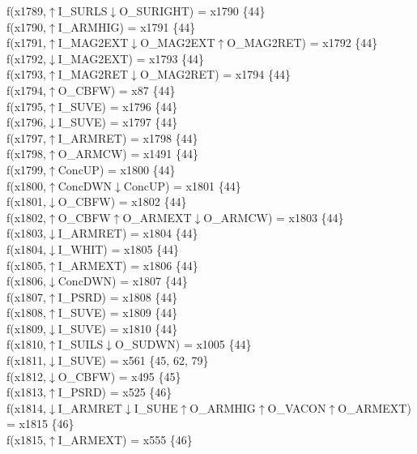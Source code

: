 f(x1789,$\uparrow$I\_SURLS$\downarrow$O\_SURIGHT) = x1790 \{44\} \\  
f(x1790,$\uparrow$I\_ARMHIG) = x1791 \{44\} \\  
f(x1791,$\uparrow$I\_MAG2EXT$\downarrow$O\_MAG2EXT$\uparrow$O\_MAG2RET) = x1792 \{44\} \\  
f(x1792,$\downarrow$I\_MAG2EXT) = x1793 \{44\} \\  
f(x1793,$\uparrow$I\_MAG2RET$\downarrow$O\_MAG2RET) = x1794 \{44\} \\  
f(x1794,$\uparrow$O\_CBFW) = x87 \{44\} \\  
f(x1795,$\uparrow$I\_SUVE) = x1796 \{44\} \\  
f(x1796,$\downarrow$I\_SUVE) = x1797 \{44\} \\  
f(x1797,$\uparrow$I\_ARMRET) = x1798 \{44\} \\  
f(x1798,$\uparrow$O\_ARMCW) = x1491 \{44\} \\  
f(x1799,$\uparrow$ConcUP) = x1800 \{44\} \\  
f(x1800,$\uparrow$ConcDWN$\downarrow$ConcUP) = x1801 \{44\} \\  
f(x1801,$\downarrow$O\_CBFW) = x1802 \{44\} \\  
f(x1802,$\uparrow$O\_CBFW$\uparrow$O\_ARMEXT$\downarrow$O\_ARMCW) = x1803 \{44\} \\  
f(x1803,$\downarrow$I\_ARMRET) = x1804 \{44\} \\  
f(x1804,$\downarrow$I\_WHIT) = x1805 \{44\} \\  
f(x1805,$\uparrow$I\_ARMEXT) = x1806 \{44\} \\  
f(x1806,$\downarrow$ConcDWN) = x1807 \{44\} \\  
f(x1807,$\uparrow$I\_PSRD) = x1808 \{44\} \\  
f(x1808,$\uparrow$I\_SUVE) = x1809 \{44\} \\  
f(x1809,$\downarrow$I\_SUVE) = x1810 \{44\} \\  
f(x1810,$\uparrow$I\_SUILS$\downarrow$O\_SUDWN) = x1005 \{44\} \\  
f(x1811,$\downarrow$I\_SUVE) = x561 \{45, 62, 79\} \\  
f(x1812,$\downarrow$O\_CBFW) = x495 \{45\} \\  
f(x1813,$\uparrow$I\_PSRD) = x525 \{46\} \\  
f(x1814,$\downarrow$I\_ARMRET$\downarrow$I\_SUHE$\uparrow$O\_ARMHIG$\uparrow$O\_VACON$\uparrow$O\_ARMEXT) = x1815 \{46\} \\  
f(x1815,$\uparrow$I\_ARMEXT) = x555 \{46\} \\  
